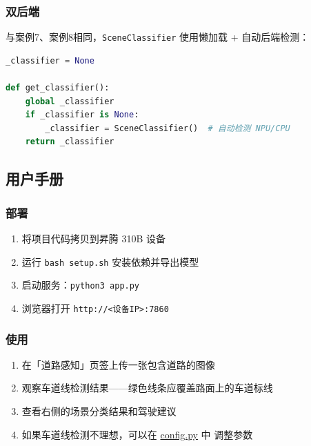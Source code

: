 \subsubsection{双后端}\label{src-experiment-case6-h21}

与案例7、案例8相同，\passthrough{\lstinline!SceneClassifier!} 使用懒加载
+ 自动后端检测：

\begin{lstlisting}[language=Python]
_classifier = None

def get_classifier():
    global _classifier
    if _classifier is None:
        _classifier = SceneClassifier()  # 自动检测 NPU/CPU
    return _classifier
\end{lstlisting}

\subsection{用户手册}\label{src-experiment-case6-h22}

\subsubsection{部署}\label{src-experiment-case6-h23}

\begin{enumerate}
\def\labelenumi{\arabic{enumi}.}
\tightlist
\item
  将项目代码拷贝到昇腾 310B 设备
\item
  运行 \passthrough{\lstinline!bash setup.sh!} 安装依赖并导出模型
\item
  启动服务：\passthrough{\lstinline!python3 app.py!}
\item
  浏览器打开 \passthrough{\lstinline!http://<设备IP>:7860!}
\end{enumerate}

\subsubsection{使用}\label{src-experiment-case6-h24}

\begin{enumerate}
\def\labelenumi{\arabic{enumi}.}
\tightlist
\item
  在「道路感知」页签上传一张包含道路的图像
\item
  观察车道线检测结果------绿色线条应覆盖路面上的车道标线
\item
  查看右侧的场景分类结果和驾驶建议
\item
  如果车道线检测不理想，可以在
  \href{https://github.com/zhouxzh/Ascend310/blob/main/samples/case6/config.py}{config.py}
  中 调整参数
\end{enumerate}

